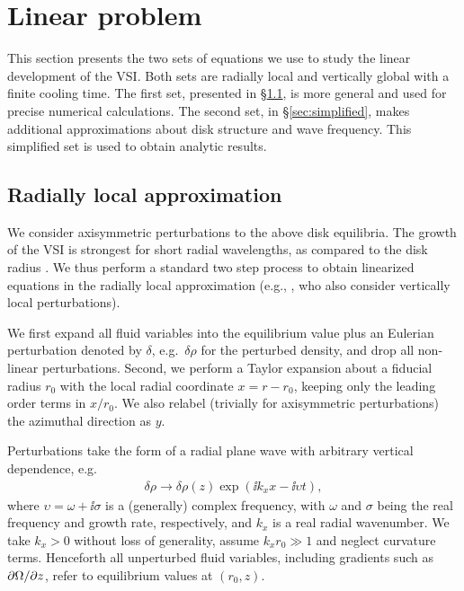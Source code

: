 \section{Linear problem}\label{linear} 
This section presents the two sets of equations we use to study the
linear development of the VSI.  Both sets are radially local and vertically global 
with a finite cooling time.
The first set, presented in \S\ref{sec:radlocal}, is more general and used 
for precise numerical calculations.  The second set, in \S\ref{sec:simplified}, makes
additional approximations  about disk structure and wave frequency.  This simplified
set is used to obtain analytic results.


\subsection{Radially local approximation}\label{sec:radlocal}
We consider axisymmetric perturbations to the above disk equilibria.    
The growth of the VSI is strongest for short radial wavelengths, as compared
 to the disk radius .  We thus perform a
 standard two step process to obtain linearized equations in the radially local 
 approximation (e.g., \citealp{goldreich67}, who also consider vertically local perturbations).  
 
 We first expand all fluid variables 
 into the equilibrium value plus an Eulerian perturbation denoted by $\delta$, e.g.\ 
 $\delta \rho$ for the perturbed density, and drop all non-linear perturbations.  Second, we perform
 a Taylor expansion about a fiducial radius $r_0$ with the local radial coordinate
 $x = r - r_0$, keeping only the leading order terms in $x/r_0$.  We also relabel 
 (trivially for axisymmetric perturbations) the azimuthal direction as $y$.  
 
 Perturbations take the form of a radial plane wave with arbitrary vertical dependence, 
 e.g.\
 \begin{align}
  \delta\rho \rightarrow \delta\rho(z)\exp{\left(\ii k_x x - \ii\upsilon
      t\right)},    
\end{align}
where $\upsilon = \omega + \ii \sigma$ is a (generally) complex frequency, 
with $\omega$ and $\sigma$ being
the real frequency and growth rate, respectively, and $k_x$ is a real 
radial wavenumber.  We take $k_x>0$ without loss of generality, 
assume $k_xr_0 \gg 1$ and neglect curvature terms. 
Henceforth all unperturbed fluid variables, including 
gradients such as $\partial \Omega/ \partial z$, refer to  equilibrium values at $(r_0, z)$.

